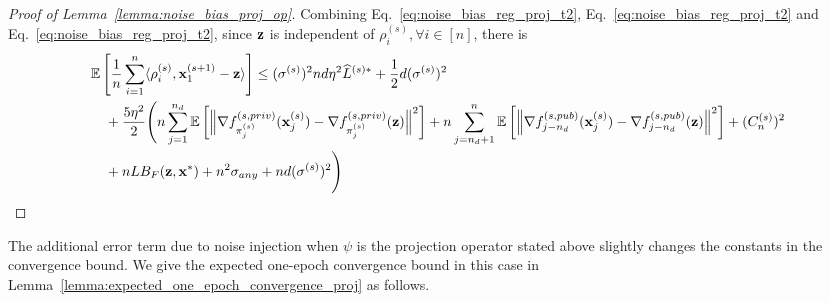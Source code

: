 \begin{proof}[Proof of Lemma~\ref{lemma:noise_bias_proj_op}]
Combining Eq.~\ref{eq:noise_bias_reg_proj_t2}, Eq.~\ref{eq:noise_bias_reg_proj_t2} and Eq.~\ref{eq:noise_bias_reg_proj_t2}, since ${\mathbf{z}}$ is independent of $\rho_{i}^{(s)}, \forall i\in [n]$, there is
\begin{align}
    &\mathbb{E}\left[\frac{1}{n}\sum_{i=1}^{n} \langle \rho_i^{(s)}, {\mathbf{x}}_1^{(s+1)} - {\mathbf{z}} \rangle \right] 
    \leq (\sigma^{(s)})^2 nd \eta^2 \widehat{L}^{(s)*}
    + \frac{1}{2}d (\sigma^{(s)})^2\\
    \nonumber
    &\quad + \frac{5\eta^2}{2} \Bigg(
        n\sum_{j=1}^{n_d} \mathbb{E}\left[\Big\| \nabla f_{\pi_j^{(s)}}^{(s,priv)}({\mathbf{x}}_j^{(s)}) - \nabla f_{\pi_j^{(s)}}^{(s,priv)}({\mathbf{z}})\Big\|^2\right]
        + n \sum_{j=n_d+1}^{n} \mathbb{E}\left[\Big\| \nabla f_{j-n_d}^{(s,pub)}({\mathbf{x}}_j^{(s)})
        - \nabla f_{j-n_d}^{(s,pub)}({\mathbf{z}})
        \Big\|^2 \right]
        + (C_n^{(s)})^2\\
    \nonumber
    &\quad + n L B_F({\mathbf{z}}, {\mathbf{x}}^*) + n^2 \sigma_{any} + n d (\sigma^{(s)})^2
    \Bigg)
\end{align}
    
\end{proof}


The additional error term due to noise injection when $\psi$ is the projection operator stated above slightly changes the constants in the convergence bound. We give the expected one-epoch convergence bound in this case in Lemma~\ref{lemma:expected_one_epoch_convergence_proj} as follows.



